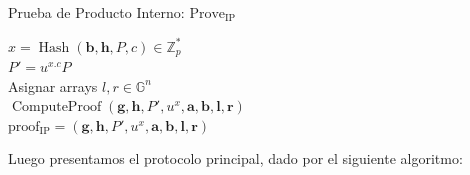 \begin{minipage}{0.9\textwidth}
    \begin{algorithm}[H]
        \caption{Prueba de Producto Interno: $\operatorname{Prove_{IP}}$}
        $x = \operatorname{Hash}(\mathbf{b}, \mathbf{h}, P, c) \in \mathbb{Z}^{*}_{p}$ \\
        $P' = u^{x.c}P$ \\
        Asignar arrays $l, r \in \mathbb{G}^{n}$ \\
        $\operatorname{ComputeProof}(\mathbf{g}, \mathbf{h}, P', u^{x}, \mathbf{a}, \mathbf{b}, \mathbf{l}, \mathbf{r})$ \\
        $\operatorname{proof_{IP}} = (\mathbf{g}, \mathbf{h}, P', u^{x}, \mathbf{a}, \mathbf{b}, \mathbf{l}, \mathbf{r})$ \\
    \end{algorithm}
\end{minipage}

Luego presentamos el protocolo principal, dado por el siguiente algoritmo:

